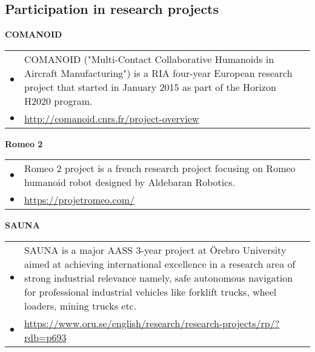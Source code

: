 \documentclass[a4paper,10pt]{report}
\begin{document}
\subsection{\hspace{0.5cm}Participation in research projects}
\begin{adjustwidth}{1.0cm}{0pt}
    {\bf {} COMANOID} \\
        \begin{tabularx}{\linewidth}{l X}
            \hfill $\bullet$    &   COMANOID ("Multi-Contact Collaborative
                                    Humanoids in Aircraft Manufacturing")
                                    is a RIA four-year European research
                                    project that started in January 2015
                                    as part of the Horizon H2020 program.\\
            \hfill $\bullet$    &   \url{http://comanoid.cnrs.fr/project-overview}
        \end{tabularx}
    \vspace{0.15cm}


    {\bf {} Romeo 2}\\
        \begin{tabularx}{\linewidth}{l X}
            \hfill $\bullet$    &   Romeo 2 project is a french research
                                    project focusing on Romeo humanoid
                                    robot designed by Aldebaran Robotics.\\
            \hfill $\bullet$    &   \url{https://projetromeo.com/}
        \end{tabularx}
    \vspace{0.15cm}


    {\bf {} SAUNA} \\
        \begin{tabularx}{\linewidth}{l X}
            \hfill $\bullet$    &   SAUNA is a major AASS 3-year project at
                                    \"Orebro University aimed at achieving
                                    international excellence in a research area of
                                    strong industrial relevance namely,
                                    safe autonomous navigation for
                                    professional industrial vehicles like
                                    forklift trucks, wheel loaders, mining
                                    trucks etc.\\
            \hfill $\bullet$    &   \url{https://www.oru.se/english/research/research-projects/rp/?rdb=p693}
        \end{tabularx}
\end{adjustwidth}
\end{document}
